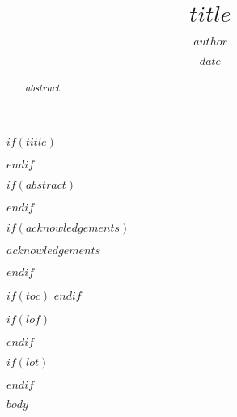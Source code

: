 \documentclass[12pt,phd,a4paper,twoside]{ucl_thesis}
\title{$title$}
\author{$author$}
\date{$date$}
\begin{document}

  $if(title)$
    \maketitle
  $endif$

\makedeclaration

  $if(abstract)$
    \begin{abstract}
      $abstract$
    \end{abstract}
  $endif$

  $if(acknowledgements)$
    \begin{acknowledgements}
      $acknowledgements$
    \end{acknowledgements}
  $endif$

  $if(toc)$
    \hypersetup{linkcolor=$if(toccolor)$$toccolor$$else$black$endif$}
   \setcounter{tocdepth}{2} 
    \tableofcontents
  $endif$

 $if(lof)$
    \listoffigures
  $endif$

  $if(lot)$
    \listoftables
  $endif$



  $body$


\end{document}
